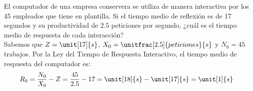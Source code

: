 \begin{ejercicio}\label{ej:5.3}
    El computador de una empresa conservera se utiliza de manera interactiva por los 45 empleados que tiene en plantilla. Si el tiempo medio de reflexión es de 17 segundos y su productividad de $2.5$ peticiones por segundo, ¿cuál es el tiempo medio de respuesta de cada interacción?\\

    Sabemos que $Z = \unit[17]{s}$, $X_0 = \unitfrac[2.5]{peticiones}{s}$ y $N_0 = 45$ trabajos. Por la Ley del Tiempo de Respuesta Interactivo, el tiempo medio de respuesta del computador es:
    \begin{equation*}
        R_0 = \dfrac{N_0}{X_0} - Z  = \dfrac{45}{2.5} - 17 = \unit[18]{s} - \unit[17]{s} = \unit[1]{s}
    \end{equation*}
\end{ejercicio}
\begin{comment}
\solucion
    El tiempo medio de respuesta de cada interacción es de 1 segundo.
\end{comment}

